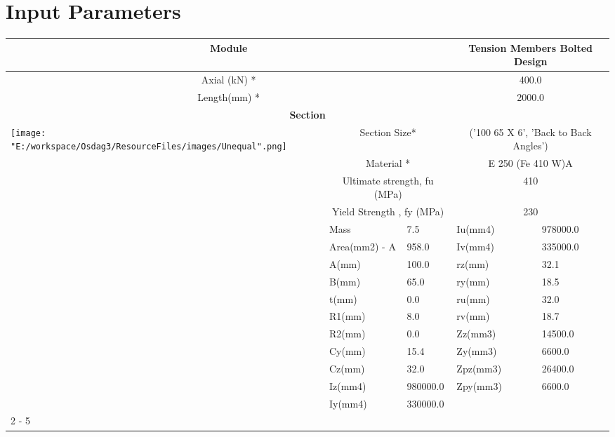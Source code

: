 \documentclass{article}%
\renewcommand{\arraystretch}{1.2}%
\begin{document}
%
\normalsize%
\pagestyle{header}%
\section{Input Parameters}%
\label{sec:InputParameters}%
\renewcommand{\arraystretch}{1.2}%
\begin{longtable}{|p{5cm}|p{2cm}|p{2cm}|p{2cm}|p{5cm}|}%
\hline%
\hline%
\multicolumn{3}{|c|}{Module}&\multicolumn{2}{|c|}{Tension Members Bolted Design}\\%
\hline%
\hline%
\multicolumn{3}{|c|}{Axial (kN) *}&\multicolumn{2}{|c|}{400.0}\\%
\hline%
\hline%
\multicolumn{3}{|c|}{Length(mm) *}&\multicolumn{2}{|c|}{2000.0}\\%
\hline%
\hline%
\multicolumn{5}{|c|}{\textbf{Section}}\\%
\hline%
\hline%
\multirow{15}{*}{\texttt{[image: "E:/workspace/Osdag3/ResourceFiles/images/Unequal".png]}}&\multicolumn{2}{|c|}{Section Size*}&\multicolumn{2}{|c|}{('100 65 X 6', 'Back to Back Angles')}\\%
\cline{2%
-%
5}%
&\multicolumn{2}{|c|}{Material *}&\multicolumn{2}{|c|}{E 250 (Fe 410 W)A}\\%
\cline{2%
-%
5}%
&\multicolumn{2}{|c|}{Ultimate strength, fu (MPa)}&\multicolumn{2}{|c|}{410}\\%
\cline{2%
-%
5}%
&\multicolumn{2}{|c|}{Yield Strength , fy (MPa)}&\multicolumn{2}{|c|}{230}\\%
\cline{2%
-%
5}%
&Mass&7.5&Iu(mm4)&978000.0\\%
\cline{2%
-%
5}%
&Area(mm2) {-} A&958.0&Iv(mm4)&335000.0\\%
\cline{2%
-%
5}%
&A(mm)&100.0&rz(mm)&32.1\\%
\cline{2%
-%
5}%
&B(mm)&65.0&ry(mm)&18.5\\%
\cline{2%
-%
5}%
&t(mm)&0.0&ru(mm)&32.0\\%
\cline{2%
-%
5}%
&R1(mm)&8.0&rv(mm)&18.7\\%
\cline{2%
-%
5}%
&R2(mm)&0.0&Zz(mm3)&14500.0\\%
\cline{2%
-%
5}%
&Cy(mm)&15.4&Zy(mm3)&6600.0\\%
\cline{2%
-%
5}%
&Cz(mm)&32.0&Zpz(mm3)&26400.0\\%
\cline{2%
-%
5}%
&Iz(mm4)&980000.0&Zpy(mm3)&6600.0\\%
\cline{2%
-%
5}%
&Iy(mm4)&330000.0&&\\%
\cline{2%
-%
5}%
\hline%
\multicolumn{5}{|c|}{\textbf{Bolt Details}}\\%

\end{longtable}
\end{document}
